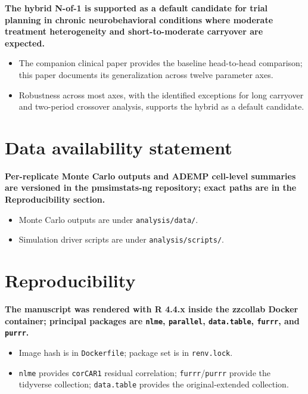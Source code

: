 \documentclass[
  11pt,
]{article}
\begin{document}
\textbf{The hybrid N-of-1 is supported as a default candidate for trial planning in chronic neurobehavioral conditions where moderate treatment heterogeneity and short-to-moderate carryover are expected.}

\begin{itemize}\setlength{\itemsep}{2pt}\setlength{\parskip}{0pt}
\item The companion clinical paper provides the baseline head-to-head comparison; this paper documents its generalization across twelve parameter axes.
\item Robustness across most axes, with the identified exceptions for long carryover and two-period crossover analysis, supports the hybrid as a default candidate.
\end{itemize}

\section{Data availability statement}\label{data-availability-statement}

\textbf{Per-replicate Monte Carlo outputs and ADEMP cell-level summaries are versioned in the pmsimstats-ng repository; exact paths are in the Reproducibility section.}

\begin{itemize}\setlength{\itemsep}{2pt}\setlength{\parskip}{0pt}
\item Monte Carlo outputs are under \texttt{analysis/data/}.
\item Simulation driver scripts are under \texttt{analysis/scripts/}.
\end{itemize}

\section{Reproducibility}\label{reproducibility}

\textbf{The manuscript was rendered with R 4.4.x inside the zzcollab Docker container; principal packages are \texttt{nlme}, \texttt{parallel}, \texttt{data.table}, \texttt{furrr}, and \texttt{purrr}.}

\begin{itemize}\setlength{\itemsep}{2pt}\setlength{\parskip}{0pt}
\item Image hash is in \texttt{Dockerfile}; package set is in \texttt{renv.lock}.
\item \texttt{nlme} provides \texttt{corCAR1} residual correlation; \texttt{furrr}/\texttt{purrr} provide the tidyverse collection; \texttt{data.table} provides the original-extended collection.
\end{itemize}
\end{document}
